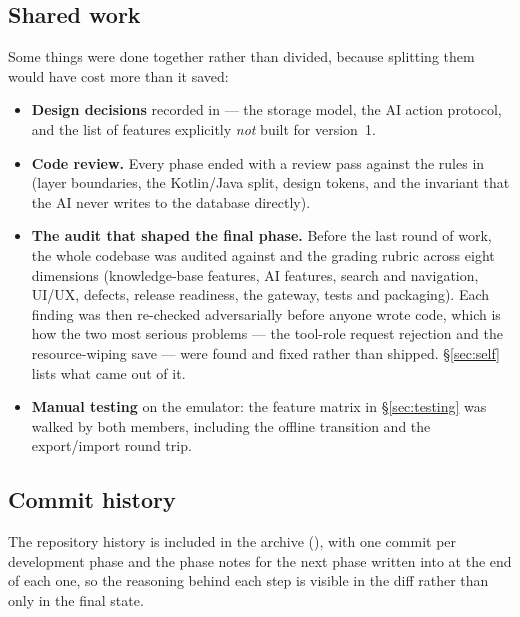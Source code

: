 \subsection{Shared work}

Some things were done together rather than divided, because splitting them would have cost more than it
saved:

\begin{itemize}
  \item \textbf{Design decisions} recorded in  --- the storage model, the AI action
        protocol, and the list of features explicitly \emph{not} built for version~1.
  \item \textbf{Code review.} Every phase ended with a review pass against the rules in
         (layer boundaries, the Kotlin/Java split, design tokens, and the invariant that
        the AI never writes to the database directly).
  \item \textbf{The audit that shaped the final phase.} Before the last round of work, the whole codebase
        was audited against  and the grading rubric across eight dimensions
        (knowledge-base features, AI features, search and navigation, UI/UX, defects, release readiness,
        the gateway, tests and packaging). Each finding was then re-checked adversarially before anyone
        wrote code, which is how the two most serious problems --- the tool-role request rejection and the
        resource-wiping save --- were found and fixed rather than shipped. \S\ref{sec:self} lists what came
        out of it.
  \item \textbf{Manual testing} on the emulator: the feature matrix in \S\ref{sec:testing} was walked by
        both members, including the offline transition and the export/import round trip.
\end{itemize}

\subsection{Commit history}

The repository history is included in the archive (), with one commit per development
phase and the phase notes for the next phase written into  at the end of each one, so
the reasoning behind each step is visible in the diff rather than only in the final state.
